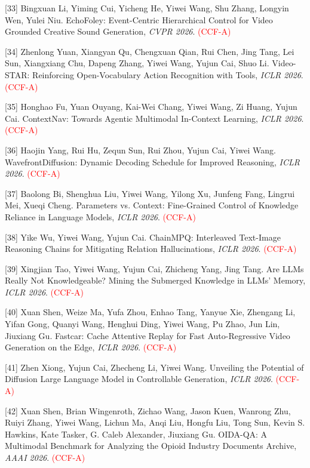 [33] Bingxuan Li, Yiming Cui, Yicheng He, Yiwei Wang, Shu Zhang, Longyin Wen, Yulei Niu. EchoFoley: Event-Centric Hierarchical Control for Video Grounded Creative Sound Generation, \textit{CVPR 2026}. \textcolor{red}{(CCF-A)}

[34] Zhenlong Yuan, Xiangyan Qu, Chengxuan Qian, Rui Chen, Jing Tang, Lei Sun, Xiangxiang Chu, Dapeng Zhang, Yiwei Wang, Yujun Cai, Shuo Li. Video-STAR: Reinforcing Open-Vocabulary Action Recognition with Tools, \textit{ICLR 2026}. \textcolor{red}{(CCF-A)}

[35] Honghao Fu, Yuan Ouyang, Kai-Wei Chang, Yiwei Wang, Zi Huang, Yujun Cai. ContextNav: Towards Agentic Multimodal In-Context Learning, \textit{ICLR 2026}. \textcolor{red}{(CCF-A)}

[36] Haojin Yang, Rui Hu, Zequn Sun, Rui Zhou, Yujun Cai, Yiwei Wang. WavefrontDiffusion: Dynamic Decoding Schedule for Improved Reasoning, \textit{ICLR 2026}. \textcolor{red}{(CCF-A)}

[37] Baolong Bi, Shenghua Liu, Yiwei Wang, Yilong Xu, Junfeng Fang, Lingrui Mei, Xueqi Cheng. Parameters vs. Context: Fine-Grained Control of Knowledge Reliance in Language Models, \textit{ICLR 2026}. \textcolor{red}{(CCF-A)}

[38] Yike Wu, Yiwei Wang, Yujun Cai. ChainMPQ: Interleaved Text-Image Reasoning Chains for Mitigating Relation Hallucinations, \textit{ICLR 2026}. \textcolor{red}{(CCF-A)}

[39] Xingjian Tao, Yiwei Wang, Yujun Cai, Zhicheng Yang, Jing Tang. Are LLMs Really Not Knowledgeable? Mining the Submerged Knowledge in LLMs' Memory, \textit{ICLR 2026}. \textcolor{red}{(CCF-A)}

[40] Xuan Shen, Weize Ma, Yufa Zhou, Enhao Tang, Yanyue Xie, Zhengang Li, Yifan Gong, Quanyi Wang, Henghui Ding, Yiwei Wang, Pu Zhao, Jun Lin, Jiuxiang Gu. Fastcar: Cache Attentive Replay for Fast Auto-Regressive Video Generation on the Edge, \textit{ICLR 2026}. \textcolor{red}{(CCF-A)}

[41] Zhen Xiong, Yujun Cai, Zhecheng Li, Yiwei Wang. Unveiling the Potential of Diffusion Large Language Model in Controllable Generation, \textit{ICLR 2026}. \textcolor{red}{(CCF-A)}

[42] Xuan Shen, Brian Wingenroth, Zichao Wang, Jason Kuen, Wanrong Zhu, Ruiyi Zhang, Yiwei Wang, Lichun Ma, Anqi Liu, Hongfu Liu, Tong Sun, Kevin S. Hawkins, Kate Tasker, G. Caleb Alexander, Jiuxiang Gu. OIDA-QA: A Multimodal Benchmark for Analyzing the Opioid Industry Documents Archive, \textit{AAAI 2026}. \textcolor{red}{(CCF-A)}

